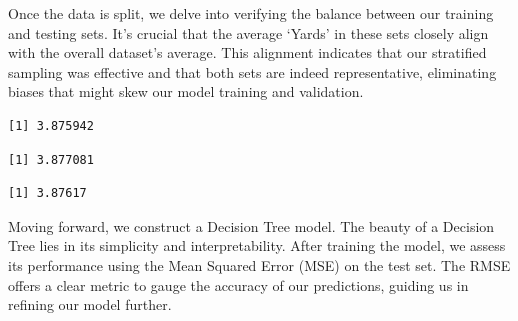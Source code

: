 \documentclass[
  super,
  preprint,
  3p]{elsarticle}
\newenvironment{Shaded}{\begin{snugshade}}{\end{snugshade}}
\newcommand{\CommentTok}[1]{\textcolor[rgb]{0.37,0.37,0.37}{#1}}
\newcommand{\FunctionTok}[1]{\textcolor[rgb]{0.28,0.35,0.67}{#1}}
\newcommand{\NormalTok}[1]{\textcolor[rgb]{0.00,0.23,0.31}{#1}}
\newcommand{\OtherTok}[1]{\textcolor[rgb]{0.00,0.23,0.31}{#1}}
\newcommand{\SpecialCharTok}[1]{\textcolor[rgb]{0.37,0.37,0.37}{#1}}
\begin{document}
Once the data is split, we delve into verifying the balance between our
training and testing sets. It's crucial that the average `Yards' in
these sets closely align with the overall dataset's average. This
alignment indicates that our stratified sampling was effective and that
both sets are indeed representative, eliminating biases that might skew
our model training and validation.

\begin{Shaded}
\end{Shaded}

\begin{verbatim}
[1] 3.875942
\end{verbatim}

\begin{Shaded}
\end{Shaded}

\begin{verbatim}
[1] 3.877081
\end{verbatim}

\begin{Shaded}
\end{Shaded}

\begin{verbatim}
[1] 3.87617
\end{verbatim}

Moving forward, we construct a Decision Tree model. The beauty of a
Decision Tree lies in its simplicity and interpretability. After
training the model, we assess its performance using the Mean Squared
Error (MSE) on the test set. The RMSE offers a clear metric to gauge the
accuracy of our predictions, guiding us in refining our model further.
\end{document}
